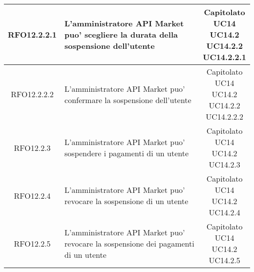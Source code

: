 \begin{longtable}{|c|p{8cm}|c|}
\hypertarget{RFO12.2.2.1}{RFO12.2.2.1} &  L'amministratore API Market puo' scegliere la durata della sospensione dell'utente& \makecell*{Capitolato\\UC14\\UC14.2\\UC14.2.2\\UC14.2.2.1} \\
\hline

\hypertarget{RFO12.2.2.2}{RFO12.2.2.2} &  L'amministratore API Market puo' confermare la sospensione dell'utente& \makecell*{Capitolato\\UC14\\UC14.2\\UC14.2.2\\UC14.2.2.2} \\
\hline

\hypertarget{RFO12.2.3}{RFO12.2.3} &  L'amministratore API Market puo' sospendere i pagamenti di un utente& \makecell*{Capitolato\\UC14\\UC14.2\\UC14.2.3} \\
\hline

\hypertarget{RFO12.2.4}{RFO12.2.4} &  L'amministratore API Market puo' revocare la sospensione di un utente& \makecell*{Capitolato\\UC14\\UC14.2\\UC14.2.4} \\
\hline

\hypertarget{RFO12.2.5}{RFO12.2.5} &  L'amministratore API Market puo' revocare la sospensione dei pagamenti di un utente& \makecell*{Capitolato\\UC14\\UC14.2\\UC14.2.5} \\
\hline


\end{longtable}

